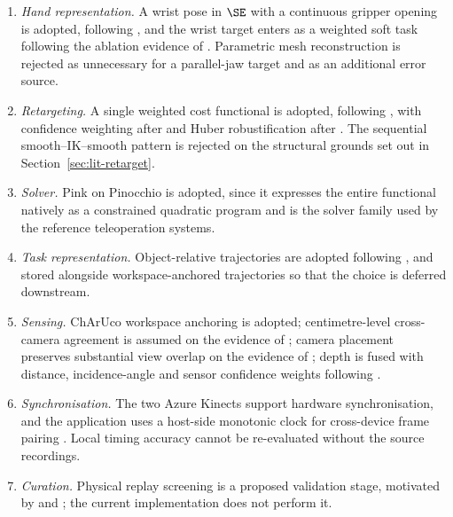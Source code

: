 \begin{enumerate}[leftmargin=2em]
  \item \emph{Hand representation.} A wrist pose in $\SE$ with a continuous
        gripper opening is adopted, following \cite{opentv, bunny, ace}, and the wrist
        target enters as a weighted soft task following the ablation evidence
        of \cite{keyobj}. Parametric mesh reconstruction is rejected as
        unnecessary for a parallel-jaw target and as an additional error source.
  \item \emph{Retargeting.} A single weighted cost functional is adopted,
        following \cite{anyteleop, dexflow}, with confidence weighting after
        \cite{opentv} and Huber robustification after \cite{dexteleop0}. The
        sequential smooth--IK--smooth pattern is rejected on the structural
        grounds set out in Section~\ref{sec:lit-retarget}.
  \item \emph{Solver.} Pink on Pinocchio \cite{pink} is adopted, since it
        expresses the entire functional natively as a constrained quadratic
        program and is the solver family used by the reference teleoperation
        systems.
  \item \emph{Task representation.} Object-relative trajectories are adopted
        following \cite{orion, spot}, and stored alongside workspace-anchored
        trajectories so that the choice is deferred downstream.
  \item \emph{Sensing.} ChArUco workspace anchoring is adopted; centimetre-level
        cross-camera agreement is assumed on the evidence of \cite{romeo};
        camera placement preserves substantial view overlap on the evidence of
        \cite{bulee}; depth is fused with distance, incidence-angle and sensor
        confidence weights following \cite{fusionpatent, zeng}.
  \item \emph{Synchronisation.} The two Azure Kinects support hardware
        synchronisation, and the application uses a host-side monotonic
        clock for cross-device frame pairing \cite{ridgerun}. Local timing
        accuracy cannot be re-evaluated without the source recordings.
  \item \emph{Curation.} Physical replay screening is a proposed validation
        stage, motivated by \cite{demoscore} and \cite{howtransfer}; the
        current implementation does not perform it.
\end{enumerate}
